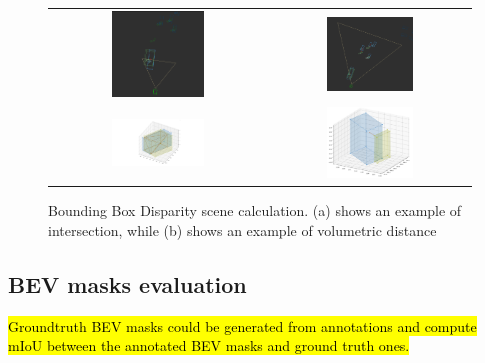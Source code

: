 \begin{figure}[h]
    \centering
    \setlength{\tabcolsep}{1pt}  %
    \renewcommand{\arraystretch}{0.5}
    \begin{tabular}{c c}
        
        \includegraphics[width=0.45\textwidth]{images/experiments/frame_0_3d_scene.png} &
        \includegraphics[width=0.45\textwidth]{images/experiments/frame_2_3d_scene.png} \\
        
        \includegraphics[width=0.45\textwidth]{images/experiments/frame_0_3d_bb.png} &
        \includegraphics[width=0.45\textwidth]{images/experiments/frame_2_3d_bb.png} \\

    \end{tabular}
    
    \caption{Bounding Box Disparity scene calculation. (a) shows an example of intersection, while (b) shows an example of volumetric distance}
    \label{fig:bbox_disparity}
\end{figure}


\subsection{BEV masks evaluation}
\hl{Groundtruth BEV masks could be generated from annotations and compute mIoU between the annotated BEV masks and ground truth ones.}

